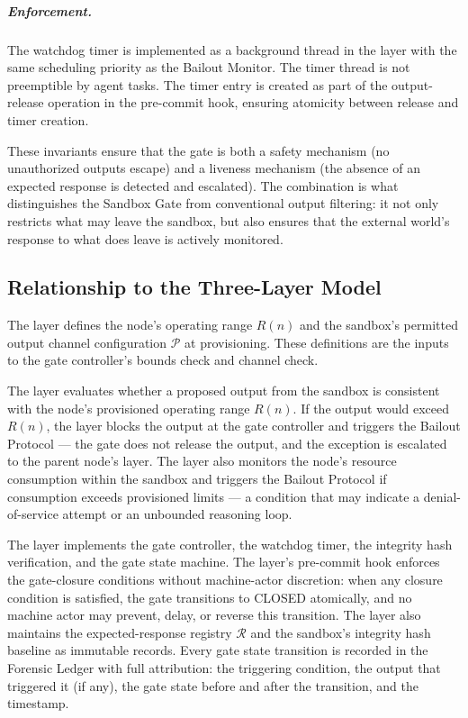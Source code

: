 \subparagraph{Enforcement.} The watchdog timer is implemented as a background thread in the \fact{} layer with the same scheduling priority as the Bailout Monitor. The timer thread is not preemptible by agent tasks. The timer entry is created as part of the output-release operation in the pre-commit hook, ensuring atomicity between release and timer creation.

These invariants ensure that the gate is both a safety mechanism (no unauthorized outputs escape) and a liveness mechanism (the absence of an expected response is detected and escalated). The combination is what distinguishes the Sandbox Gate from conventional output filtering: it not only restricts what may leave the sandbox, but also ensures that the external world's response to what does leave is actively monitored.

\subsection{Relationship to the Three-Layer Model}\label{sec:sandbox-three-layer}

The \purpose{} layer defines the node's operating range $R(n)$ and the sandbox's permitted output channel configuration $\mathcal{P}$ at provisioning. These definitions are the inputs to the gate controller's bounds check and channel check.

The \bounds{} layer evaluates whether a proposed output from the sandbox is consistent with the node's provisioned operating range $R(n)$. If the output would exceed $R(n)$, the \bounds{} layer blocks the output at the gate controller and triggers the Bailout Protocol — the gate does not release the output, and the exception is escalated to the parent node's \purpose{} layer. The \bounds{} layer also monitors the node's resource consumption within the sandbox and triggers the Bailout Protocol if consumption exceeds provisioned limits — a condition that may indicate a denial-of-service attempt or an unbounded reasoning loop.

The \fact{} layer implements the gate controller, the watchdog timer, the integrity hash verification, and the gate state machine. The layer's pre-commit hook enforces the gate-closure conditions without machine-actor discretion: when any closure condition is satisfied, the gate transitions to CLOSED atomically, and no machine actor may prevent, delay, or reverse this transition. The layer also maintains the expected-response registry $\mathcal{R}$ and the sandbox's integrity hash baseline as immutable records. Every gate state transition is recorded in the Forensic Ledger with full attribution: the triggering condition, the output that triggered it (if any), the gate state before and after the transition, and the timestamp.

